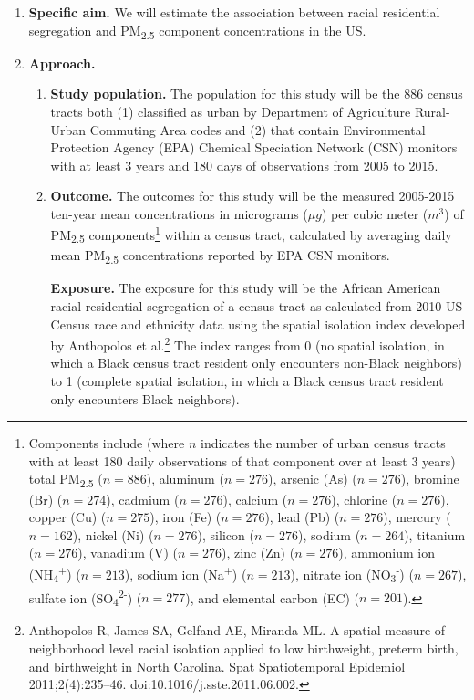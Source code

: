 \documentclass{article}\usepackage[]{graphicx}\usepackage[]{color}
\begin{document}
\begin{enumerate}[label=\textbf{\arabic*.}]
  \item \textbf{Specific aim.} We will estimate the association between racial residential segregation and PM\textsubscript{2.5} component concentrations in the US.
  
  \item \textbf{Approach.}
  
  \begin{enumerate}[label=\textbf{\alph*.}]
    
    \item \textbf{Study population.} The population for this study will be the 886 census tracts both (1) classified as urban by Department of Agriculture Rural-Urban Commuting Area codes and (2) that contain Environmental Protection Agency (EPA) Chemical Speciation Network (CSN) monitors with at least 3 years and 180 days of observations from 2005 to 2015.
    
    \item \textbf{Outcome.} The outcomes for this study will be the measured 2005-2015 ten-year mean concentrations in micrograms ($\mu g$) per cubic meter ($m^3$) of PM\textsubscript{2.5} components\footnote{Components include (where $n$ indicates the number of urban census tracts with at least 180 daily observations of that component over at least 3 years) total PM\textsubscript{2.5} ($n=886$), aluminum ($n=276$), arsenic (As) ($n=276$), bromine (Br) ($n=274$), cadmium ($n=276$), calcium ($n=276$), chlorine ($n=276$), copper (Cu) ($n=275$), iron (Fe) ($n=276$), lead (Pb) ($n=276$), mercury ($n=162$), nickel (Ni) ($n=276$), silicon ($n=276$), sodium ($n=264$), titanium ($n=276$), vanadium (V) ($n=276$), zinc (Zn) ($n=276$), ammonium ion (NH\textsubscript{4}\textsuperscript{+}) ($n=213$), sodium ion (Na\textsuperscript{+}) ($n=213$), nitrate ion (NO\textsubscript{3}\textsuperscript{-}) ($n=267$), sulfate ion (SO\textsubscript{4}\textsuperscript{2-}) ($n=277$), and elemental carbon (EC) ($n=201$).} within a census tract, calculated by averaging daily mean PM\textsubscript{2.5} concentrations reported by EPA CSN monitors.
    
    \textbf{Exposure.} The exposure for this study will be the African American racial residential segregation of a census tract as calculated from 2010 US Census race and ethnicity data using the spatial isolation index developed by Anthopolos et al.\footnote{Anthopolos R, James SA, Gelfand AE, Miranda ML. A spatial measure of neighborhood level racial isolation applied to low birthweight, preterm birth, and birthweight in North Carolina. Spat Spatiotemporal Epidemiol 2011;2(4):235–46. doi:10.1016/j.sste.2011.06.002.} The index ranges from 0 (no spatial isolation, in which a Black census tract resident only encounters non-Black neighbors) to 1 (complete spatial isolation, in which a Black census tract resident only encounters Black neighbors).
    

\end{enumerate}
\end{enumerate}
\end{document}
